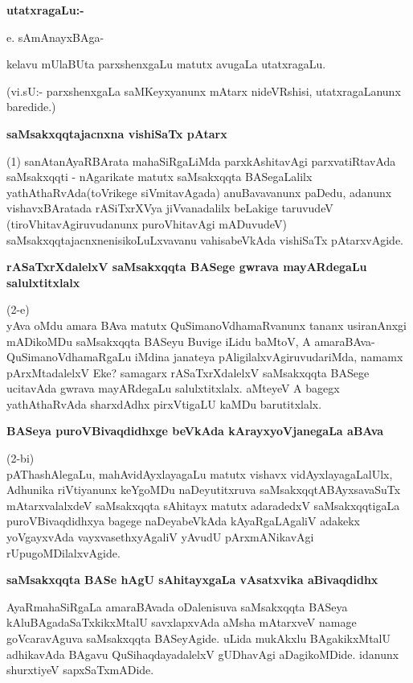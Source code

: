 {\bigskip
\noindent
{\large\bf utatxragaLu:-}}
\medskip

\noindent
e. sAmAnayxBAga-

kelavu mUlaBUta parxshenxgaLu matutx avugaLa utatxragaLu.

(vi.sU:- parxshenxgaLa saMKeyxyanunx mAtarx nideVRshisi, utatxragaLanunx baredide.)

{\bigskip
\noindent
{\large\bf saMsakxqqtajacnxna vishiSaTx pAtarx}}\label{page30}
\medskip

\noindent
(1) sanAtanAyaRBArata mahaSiRgaLiMda parxkAshitavAgi parxvatiRtavAda saMsakxqqti - nAgarikate matutx \-saMsakxqqta BASegaLalilx yathAthaRvAda(toVrikege siVmita\-vAgada) anuBavavanunx paDedu, adanunx vishavx\-BAratada rASiTxrXVya jiVvanadalilx beLakige taruvudeV (tiroVhitavAgiruvudanunx puroVhitavAgi mADu\-vudeV) saMsakxqqtajacnxnenisikoLuLxvavanu vahisabeVkAda vishiSaTx pAtarxvAgide.

{\bigskip
\noindent
{\large\bf rASaTxrXdalelxV saMsakxqqta BASege gwrava mayARdegaLu salulxtitxlalx}}\label{page30}
\medskip

\noindent
(2-e) \\yAva oMdu amara BAva matutx QuSimanoVdhamaRvanunx tananx usira\-nAnxgi mADi\-koMDu saMsakxqqta BASeyu Buvige iLidu baMtoV, A amaraBAva-\-QuSimanoVdhamaRgaLu iMdina jana\-teya pAligilalxvAgiruvudariMda, namamx pArxMtadalelxV Eke? samagarx rASaTxrXdalelxV saMsakxqqta BASege ucita\-vAda gwrava mayARdegaLu salulxtitxlalx. aMteyeV A bagegx yathAthaRvAda sharxdAdhx pirxVtigaLU kaMDu barutitxlalx.

{\bigskip
\noindent
{\large\bf BASeya puroVBivaqdidhxge beVkAda kArayxyoVjanegaLa aBAva}}\label{page31}
\medskip

\noindent
(2-bi) \\ pAThashAlegaLu, mahAvidAyxlayagaLu matutx vishavx vidAyxlayagaLalUlx, Adhunika riVtiyanunx keY\-goMDu naDeyutitxruva saMsakxqqtABAyxsavaSuTx mAtarxvalalxdeV saMsakxqqta sAhitayx matutx adaradedxV saMsakxqqti\-gaLa puroVBivaqdidhxya bagege naDeya\-beVkAda kAyaRgaLAgaliV adakekx yoVgayxvAda vayxvasethx\-yAgaliV yAvudU pArxmANikavAgi rUpugoMDilalxvAgide.

{\bigskip
\noindent
{\large\bf saMsakxqqta BASe hAgU sAhitayxgaLa vAsatxvika aBivaqdidhx}}\label{page31}
\medskip

\noindent
AyaRmahaSiRgaLa amaraBAvada oDalenisuva saMsakxqqta BASeya kAluBAga\-daSaTx\-kikxMtalU savxlapx\-vAda aMsha mAtarxveV namage goVcaravAguva saMsakxqqta BASeyAgide. uLida mukAkxlu BAgakikxMtalU adhika\-vAda BAgavu QuSihaqdayadalelxV gUDha\-vAgi aDagikoMDide. idanunx shurxtiyeV sapxSaTxmADide.

